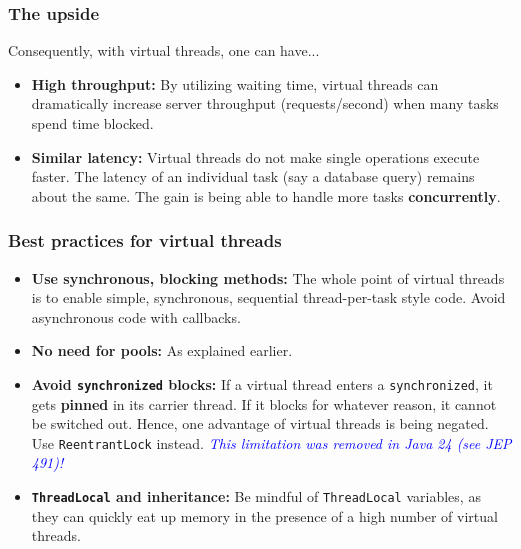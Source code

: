 \documentclass[xcolor={dvipsnames,svgnames},aspectratio=169]{beamer}
\begin{document}
\begin{frame}[fragile]
  \frametitle{The upside}

  Consequently, with virtual threads, one can have...

  \begin{itemize}
  \item[\faBook] \textbf{High throughput:} By utilizing waiting time, virtual
    threads can dramatically increase server throughput (requests/second) when
    many tasks spend time blocked.
  \item[\faBook] \textbf{Similar latency:} Virtual threads do not make single
    operations execute faster. The latency of an individual task (say a database
    query) remains about the same. The gain is being able to handle more tasks
    \textbf{concurrently}.
  \end{itemize}
\end{frame}

\begin{frame}[fragile]
  \frametitle{Best practices for virtual threads}

  \begin{itemize}
  \item[\faCheck]<1-> \textbf{Use synchronous, blocking methods:} The whole point of
    virtual threads is to enable simple, synchronous, sequential thread-per-task
    style code. Avoid asynchronous code with callbacks.
  \item[\faTimes]<2-> \textbf{No need for pools:} As explained earlier.
  \item[\faTimes]<3-> \textbf{Avoid \texttt{synchronized} blocks:} If a virtual
    thread enters a \texttt{synchronized}, it gets \textbf{pinned} in its
    carrier thread. If it blocks for whatever reason, it cannot be switched out.
    Hence, one advantage of virtual threads is being negated. Use
    \texttt{ReentrantLock} instead. \textcolor{blue}{\emph{This limitation was removed in
        Java 24 (see JEP 491)!}}
  \item[\faTimes]<4-> \textbf{\texttt{ThreadLocal} and inheritance:} Be mindful of
    \texttt{ThreadLocal} variables, as they can quickly eat up memory in the
    presence of a high number of virtual threads.
  \end{itemize}
\end{frame}
\end{document}
